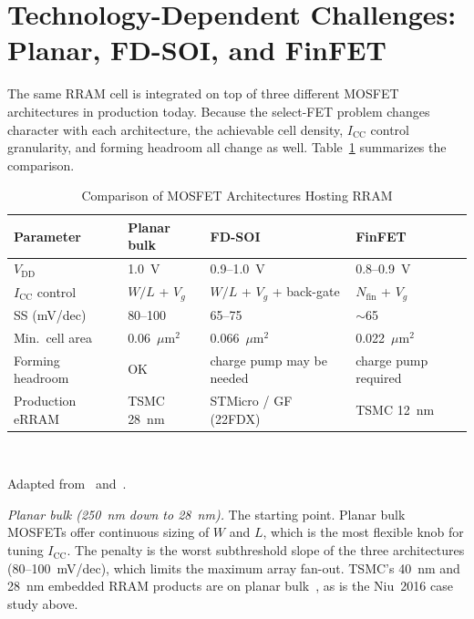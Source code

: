 \documentclass[lettersize,journal]{IEEEtran}
\begin{document}
\section{Technology-Dependent Challenges: Planar, FD-SOI, and FinFET}\label{sec:tech}
The same RRAM cell is integrated on top of three different MOSFET architectures in production today. Because the select-FET problem changes character with each architecture, the achievable cell density, $I_\mathrm{CC}$ control granularity, and forming headroom all change as well. Table~\ref{tab:arch} summarizes the comparison.

\begin{table}[!t]
\caption{Comparison of MOSFET Architectures Hosting RRAM\label{tab:arch}}
\centering
\footnotesize
\renewcommand{\arraystretch}{1.25}
\begin{tabular}{|p{0.85in}|p{0.6in}|p{0.6in}|p{0.6in}|}
\hline
\textbf{Parameter} & \textbf{Planar bulk} & \textbf{FD-SOI} & \textbf{FinFET} \\
\hline
$V_\mathrm{DD}$ & 1.0~V & 0.9--1.0~V & 0.8--0.9~V \\
\hline
$I_\mathrm{CC}$ control & $W/L$ + $V_g$ & $W/L$ + $V_g$ + back-gate & $N_\mathrm{fin}$ + $V_g$ \\
\hline
SS (mV/dec) & 80--100 & 65--75 & $\sim$65 \\
\hline
Min.\ cell area & 0.06~$\mu$m$^2$ & 0.066~$\mu$m$^2$ & 0.022~$\mu$m$^2$ \\
\hline
Forming headroom & OK & charge pump may be needed & charge pump required \\
\hline
Production eRRAM & TSMC 28~nm & STMicro / GF (22FDX) & TSMC 12~nm \\
\hline
\end{tabular}
\\[2pt]
\raggedright Adapted from~\cite{ref_ielmini2016} and~\cite{ref_hellenbrand2024}.
\end{table}

\textit{Planar bulk (250~nm down to 28~nm).} The starting point. Planar bulk MOSFETs offer continuous sizing of $W$ and $L$, which is the most flexible knob for tuning $I_\mathrm{CC}$. The penalty is the worst subthreshold slope of the three architectures (80--100~mV/dec), which limits the maximum array fan-out. TSMC's 40~nm and 28~nm embedded RRAM products are on planar bulk~\cite{ref_hellenbrand2024}, as is the Niu~2016 case study above.
\end{document}
